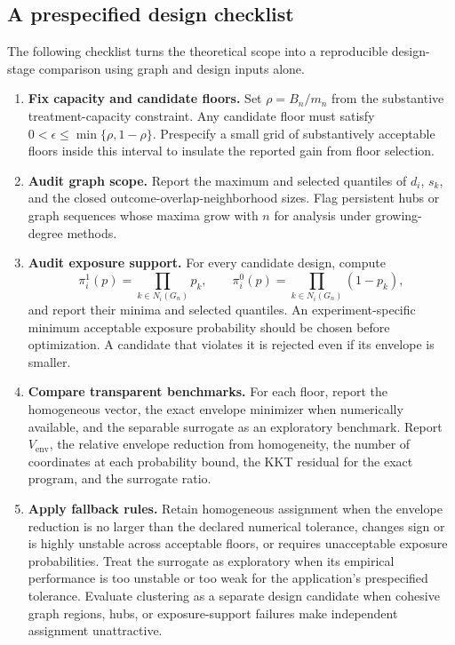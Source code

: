 \documentclass[11pt]{article}
\begin{document}
\subsection{A prespecified design checklist}

The following checklist turns the theoretical scope into a reproducible design-stage comparison using graph and design inputs alone.

\begin{enumerate}
\item \textbf{Fix capacity and candidate floors.} Set \(\rho=B_n/m_n\) from the substantive treatment-capacity constraint. Any candidate floor must satisfy \(0<\epsilon\leq\min\{\rho,1-\rho\}\). Prespecify a small grid of substantively acceptable floors inside this interval to insulate the reported gain from floor selection.
\item \textbf{Audit graph scope.} Report the maximum and selected quantiles of \(d_i\), \(s_k\), and the closed outcome-overlap-neighborhood sizes. Flag persistent hubs or graph sequences whose maxima grow with \(n\) for analysis under growing-degree methods.
\item \textbf{Audit exposure support.} For every candidate design, compute
\[
\pi_i^1(p)=\prod_{k\in N_i(G_n)}p_k,
\qquad
\pi_i^0(p)=\prod_{k\in N_i(G_n)}(1-p_k),
\]
and report their minima and selected quantiles. An experiment-specific minimum acceptable exposure probability should be chosen before optimization. A candidate that violates it is rejected even if its envelope is smaller.
\item \textbf{Compare transparent benchmarks.} For each floor, report the homogeneous vector, the exact envelope minimizer when numerically available, and the separable surrogate as an exploratory benchmark. Report \(V_{\mathrm{env}}\), the relative envelope reduction from homogeneity, the number of coordinates at each probability bound, the KKT residual for the exact program, and the surrogate ratio.
\item \textbf{Apply fallback rules.} Retain homogeneous assignment when the envelope reduction is no larger than the declared numerical tolerance, changes sign or is highly unstable across acceptable floors, or requires unacceptable exposure probabilities. Treat the surrogate as exploratory when its empirical performance is too unstable or too weak for the application's prespecified tolerance. Evaluate clustering as a separate design candidate when cohesive graph regions, hubs, or exposure-support failures make independent assignment unattractive.
\end{enumerate}
\end{document}
